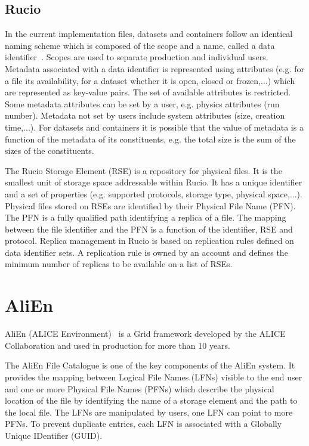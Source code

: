 \subsection{Rucio}
In the current implementation files, datasets and containers follow an identical naming scheme which is composed 
of the scope and a name, called a data identifier~\cite{ATLAS-Rucio}. Scopes are used to separate production and 
individual users. Metadata associated with a data identifier is represented using attributes (e.g. for a file its 
availability, for a dataset whether it is open, closed or frozen,...) which are represented as key-value pairs. 
The set of available attributes is restricted. Some metadata attributes can be set by a user, e.g. physics 
attributes (run number). Metadata not set by users include system attributes (size, creation time,...). 
For datasets and containers it is possible that the value of metadata is a function of the metadata of its
constituents, e.g. the total size is the sum of the sizes of the constituents.

The Rucio Storage Element (RSE) is a repository for physical files. It is the smallest unit of
storage space addressable within Rucio. It has a unique identifier and a set of properties (e.g. supported 
protocols, storage type, physical space,...). Physical files stored on RSEs are identified by their Physical File 
Name (PFN).
The PFN is a fully qualified path identifying a replica of a file. The mapping between the file identifier and
the PFN is a function of the identifier, RSE and protocol. Replica management in Rucio is based on
replication rules defined on data identifier sets. A replication rule is owned by an account and defines the 
minimum number of replicas to be available on a list of RSEs.

\section{AliEn}

AliEn (ALICE Environment)~\cite{AliEn2} is a Grid framework developed by the ALICE
Collaboration and used in production for more than 10 years. 

The AliEn File Catalogue is one of the key components of the AliEn system. It
provides the mapping between Logical File Names (LFNs) visible to the end user
and one or more Physical File Names (PFNs) which describe the physical location
of the file by identifying the name of a storage element and the path to the
local file. The LFNs are manipulated by users, one LFN can point to more PFNs.
To prevent duplicate entries, each LFN is associated with a Globally Unique
IDentifier (GUID).


